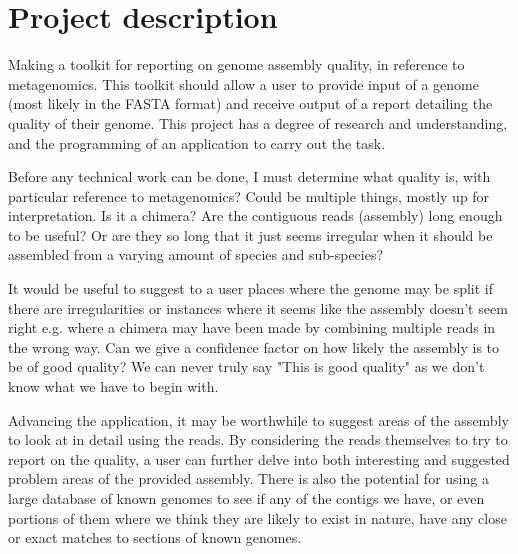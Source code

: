 \documentclass[11pt,fleqn,twoside]{article}
\begin{document}
\wordcount{}

\mmp

\setcounter{tocdepth}{3} %


\section{Project description}
Making a toolkit for reporting on genome assembly quality, in reference to metagenomics. This toolkit should allow a user to provide input of a genome (most likely in the FASTA format) and receive output of a report detailing the quality of their genome. This project has a degree of research and understanding, and the programming of an application to carry out the task.

Before any technical work can be done, I must determine what quality is, with particular reference to metagenomics? Could be multiple things, mostly up for interpretation. Is it a chimera? Are the contiguous reads (assembly) long enough to be useful? Or are they so long that it just seems irregular when it should be assembled from a varying amount of species and sub-species?

It would be useful to suggest to a user places where the genome may be split if there are irregularities or instances where it seems like the assembly doesn't seem right e.g. where a chimera may have been made by combining multiple reads in the wrong way. Can we give a confidence factor on how likely the assembly is to be of good quality? We can never truly say "This is good quality" as we don't know what we have to begin with.

Advancing the application, it may be worthwhile to suggest areas of the assembly to look at in detail using the reads. By considering the reads themselves to try to report on the quality, a user can further delve into both interesting and suggested problem areas of the provided assembly. There is also the potential for using a large database of known genomes to see if any of the contigs we have, or even portions of them where we think they are likely to exist in nature, have any close or exact matches to sections of known genomes.
\end{document}
